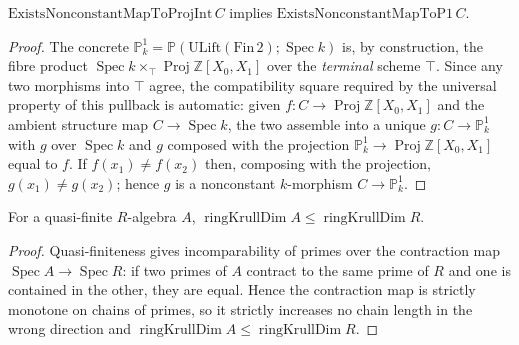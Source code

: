 \begin{proposition}
  \label{mk-lem:adelic_nonconstant_projint_bridge}
  \leanok
  \(\mathrm{ExistsNonconstantMapToProjInt}\, C\) implies
  \(\mathrm{ExistsNonconstantMapToP1}\, C\).
\end{proposition}
\begin{proof}
  \leanok
  The concrete \(\mathbb{P}^1_k = \mathbb{P}(\mathrm{ULift}(\mathrm{Fin}\,
  2); \operatorname{Spec} k)\) is, by construction, the fibre product
  \(\operatorname{Spec} k \times_{\top} \operatorname{Proj}
  \mathbb{Z}[X_0, X_1]\) over the \emph{terminal} scheme \(\top\). Since
  any two morphisms into \(\top\) agree, the compatibility square
  required by the universal property of this pullback is automatic:
  given \(f \colon C \to \operatorname{Proj} \mathbb{Z}[X_0, X_1]\) and
  the ambient structure map \(C \to \operatorname{Spec} k\), the two
  assemble into a unique \(g \colon C \to \mathbb{P}^1_k\) with
  \(g\) over \(\operatorname{Spec} k\) and \(g\) composed with the
  projection \(\mathbb{P}^1_k \to \operatorname{Proj} \mathbb{Z}[X_0,
  X_1]\) equal to \(f\). If \(f(x_1) \ne f(x_2)\) then, composing with
  the projection, \(g(x_1) \ne g(x_2)\); hence \(g\) is a nonconstant
  \(k\)-morphism \(C \to \mathbb{P}^1_k\).
\end{proof}

\begin{lemma}
  \label{mk-lem:adelic_quasiFinite_dim_le}
  \leanok
  For a quasi-finite \(R\)-algebra \(A\), \(\operatorname{ringKrullDim}
  A \le \operatorname{ringKrullDim} R\).
\end{lemma}
\begin{proof}
  \leanok
  Quasi-finiteness gives incomparability of primes over the contraction
  map \(\operatorname{Spec} A \to \operatorname{Spec} R\): if two primes
  of \(A\) contract to the same prime of \(R\) and one is contained in
  the other, they are equal. Hence the contraction map is strictly
  monotone on chains of primes, so it strictly increases no chain
  length in the wrong direction and \(\operatorname{ringKrullDim} A \le
  \operatorname{ringKrullDim} R\).
\end{proof}

